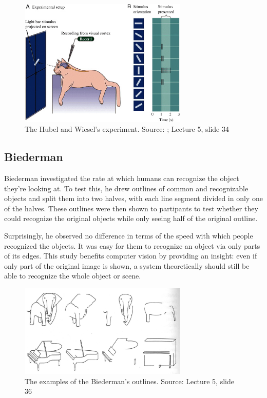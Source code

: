 \documentclass{article}
\begin{document}
\begin{figure}[H]
\centering
\includegraphics[width=8cm]{hubel_wiesel_cat.jpg}
\caption{The Hubel and Wiesel's experiment. Source: \cite{hubel1960receptive}; Lecture 5, slide 34}
\end{figure}

\subsection{Biederman}
Biederman investigated the rate at which humans can recognize the object they're looking at. To test this, he drew outlines of common and recognizable objects and split them into two halves, with each line segment divided in only one of the halves. These outlines were then shown to partipants to test whether they could recognize the original objects while only seeing half of the original outline. \newline

Surprisingly, he observed no difference in terms of the speed with which people recognized the objects. It was easy for them to recognize an object via only parts of its edges. This study benefits computer vision by providing an insight: even if only part of the original image is shown, a system theoretically should still be able to recognize the whole object or scene.

\begin{figure}[H]
\centering
\includegraphics[width=8cm]{biederman_outlines.png}
\caption{The examples of the Biederman's outlines. Source: Lecture 5, slide 36}
\end{figure}
\end{document}
